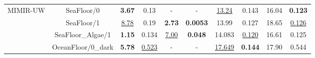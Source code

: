 \begin{table*}[ht!]
{\begin{tabular}{rccccccccc}
\midrule
\multirow{4}{*}{MIMIR-UW \cite{dataset:mimir}} 
                                & SeaFloor/0       & \textbf{3.67} & 0.13 &  - & - &  \underline{13.24}  & 0.143 & 16.04 &  \textbf{0.123}  \\
                                & SeaFloor/1       & \underline{8.78} & 0.19  & \textbf{2.73} & \textbf{0.0053} &  13.99  & 0.127 & 18.65 &  \underline{0.126}  \\
                                & SeaFloor\_Algae/1     & \textbf{1.15} & 0.134   & \underline{7.00} & \textbf{0.048}   & 14.083  & \underline{0.120} & 16.61 & 0.125  \\
                                & OceanFloor/0\_dark & \textbf{5.78} & \underline{0.523}   &  - & - &  \underline{17.649}  & \textbf{0.144} & 17.90 &  0.544  \\

\bottomrule

\end{tabular}}
\end{table*}





